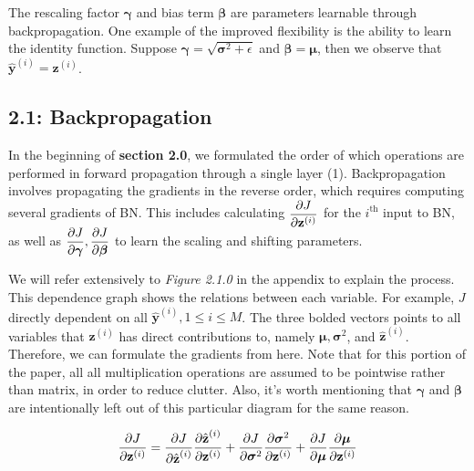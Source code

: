 \documentclass{article}
\begin{document}
\begin{multicols}{2}
The rescaling factor $\boldsymbol{\gamma}$ and bias term $\boldsymbol{\beta}$ are 
parameters learnable through backpropagation. One example of the improved
flexibility is the ability to learn the identity function. Suppose $\boldsymbol{\gamma} = \sqrt{\boldsymbol{\sigma}^2 + \epsilon}$
and $\boldsymbol{\beta} = \boldsymbol{\mu}$, then we observe that $\hat{\textbf{y}}^{(i)} = \textbf{z}^{(i)}$.







\subsection*{2.1: Backpropagation}

In the beginning of \textbf{section 2.0}, we formulated the order of which
operations are performed in forward propagation through a single layer (1). 
Backpropagation involves propagating the gradients in the reverse order, which
requires computing several gradients of BN. This includes calculating 
$\begin{aligned}
    {\partial J \over \partial \textbf{z}^{(i)}}
\end{aligned}$ for the $i^{\text{th}}$ input to BN, as well as $\begin{aligned}
    {\partial J \over \partial \boldsymbol{\gamma}}, {\partial J \over \partial \boldsymbol{\beta}}
\end{aligned}$ to learn the scaling and shifting parameters.

We will refer extensively to \textit{Figure 2.1.0} in the appendix 
to explain the process. This dependence graph shows the relations between 
each variable. For example, $J$ directly dependent on all $\hat{\textbf{y}}^{(i)}, 1 \leq i \leq M$.
The three bolded vectors points to all variables that $\textbf{z}^{(i)}$ has 
direct contributions to, namely $\boldsymbol{\mu}, \boldsymbol{\sigma}^2$, 
and $\hat{\textbf{z}}^{(i)}$. Therefore, we can formulate the gradients from here.
Note that for this portion of the paper, all all multiplication operations
are assumed to be pointwise rather than matrix, in order to reduce clutter.
Also, it's worth mentioning that $\boldsymbol{\gamma}$ and $\boldsymbol{\beta}$
are intentionally left out of this particular diagram for the same reason.

\begin{equation}
    {\partial J \over \partial \textbf{z}^{(i)}} = {\partial J \over \partial \hat{\textbf{z}}^{(i)}}
    {\partial \hat{\textbf{z}}^{(i)} \over \partial \textbf{z}^{(i)}}
     + {\partial J \over \partial \boldsymbol{\sigma}^2} 
     {\partial \boldsymbol{\sigma}^2 \over \partial \textbf{z}^{(i)}}
     + {\partial J \over \partial \boldsymbol{\mu}}
     {\partial \boldsymbol{\mu} \over \partial \textbf{z}^{(i)}}
\end{equation}


\end{multicols}
\end{document}
